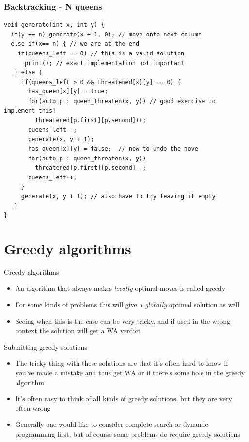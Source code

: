 \documentclass{beamer}
\begin{document}
\begin{frame}
	\frametitle{Backtracking - N queens}
	\begin{scriptsize}
	\begin{verbatim}
void generate(int x, int y) {
  if(y == n) generate(x + 1, 0); // move onto next column
  else if(x== n) { // we are at the end
    if(queens_left == 0) // this is a valid solution
      print(); // exact implementation not important
   } else {
     if(queens_left > 0 && threatened[x][y] == 0) {
       has_queen[x][y] = true;
       for(auto p : queen_threaten(x, y)) // good exercise to implement this!
         threatened[p.first][p.second]++; 
       queens_left--;
       generate(x, y + 1);
       has_queen[x][y] = false;  // now to undo the move
       for(auto p : queen_threaten(x, y))
         threatened[p.first][p.second]--; 
       queens_left++;
     }
     generate(x, y + 1); // also have to try leaving it empty
   }
}
	\end{verbatim}
	\end{scriptsize}
\end{frame}

\section*{Greedy algorithms}

\begin{frame}[plain]{Greedy algorithms}
    \begin{itemize}
        \item An algorithm that always makes \textit{locally} optimal moves is called greedy
        \item For some kinds of problems this will give a \textit{globally} optimal solution as well
        \item Seeing when this is the case can be very tricky, and if used in the wrong context the solution will get a WA verdict
    \end{itemize}
\end{frame}

\begin{frame}[plain]{Submitting greedy solutions}
    \begin{itemize}
        \item The tricky thing with these solutions are that it's often hard to know if you've made a mistake and thus get WA or if there's some hole in the greedy algorithm
        \item It's often easy to think of all kinds of greedy solutions, but they are very often wrong
        \item Generally one would like to consider complete search or dynamic programming first, but of course some problems do require greedy solutions
    \end{itemize}
\end{frame}
\end{document}
